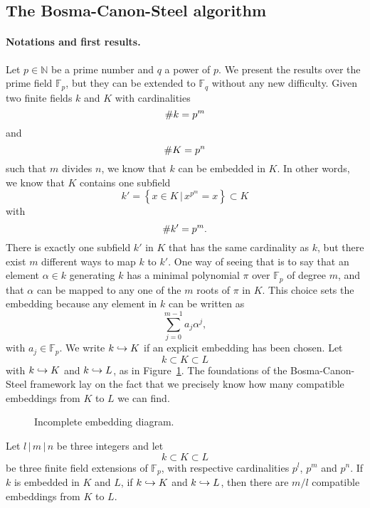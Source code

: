 \subsection{The Bosma-Canon-Steel algorithm}
\paragraph{Notations and first results.} Let $p\in\mathbb{N}$ be a prime number
and $q$ a power of $p$. We present the results over the prime field
$\mathbb{F}_p$, but they can be extended to $\mathbb{F}_q$ without any new
difficulty. Given two finite fields $k$ and $K$ with cardinalities
\[
  \# k = p^m
\]
and
\[
  \# K =  p^n
\]
such that $m$ divides $n$, we know that $k$ can be embedded in $K$. In other
words, we know that $K$ contains one subfield
\[
  k'=\left\{ x\in K\,|\,x^{p^m}=x \right\}\subset K
\]
with 
\[
  \# k' = p^m.
\]
There is exactly one subfield $k'$ in $K$ that has the same cardinality as $k$,
but there exist $m$ different ways to map $k$ to $k'$. One way of seeing that is
to say that an element $\alpha\in k$ generating $k$ has a minimal polynomial
$\pi$ over $\mathbb{F}_p$ of degree $m$, and that $\alpha$ can be mapped to any
one of the $m$ roots of $\pi$ in $K$. This choice sets the embedding because any
element in $k$ can be written as
\[
  \sum_{j=0}^{m-1}a_j \alpha^j,
\]
with $a_j\in\mathbb{F}_p$. We write $k\hookrightarrow K$ if an explicit embedding has been
chosen. Let
\[
  k\subset K\subset L
\]
with $k\hookrightarrow K$ and $k\hookrightarrow L$, as in Figure~\ref{fig:incomplete}. The foundations
of the Bosma-Canon-Steel framework lay on the fact that we precisely know how many
compatible embeddings from $K$ to $L$ we can find.
\begin{figure}%
  \centering
\caption{Incomplete embedding diagram.}
\label{fig:incomplete}
\end{figure}
\begin{prop}
  \label{prop:number-embeddings}
  Let $l\,|\,m\,|\,n$ be three integers and let
  \[
    k\subset K\subset L
  \]
  be three finite field extensions of $\mathbb{F}_p$, with respective
  cardinalities $p^l$, $p^m$ and $p^n$. If $k$ is embedded in $K$ and $L$,
  \ie if $k\hookrightarrow K$ and $k\hookrightarrow L$, then there are $m/l$ compatible embeddings
  from $K$ to $L$.
\end{prop}
